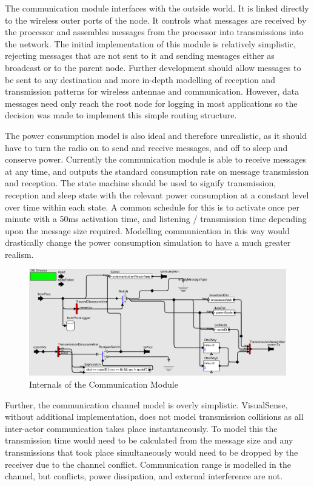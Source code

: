 \documentclass[authoryearcitations]{UoYCSproject}
\begin{document}
The communication module interfaces with the outside world. It is linked directly to the wireless outer ports of the node. It controls what messages are received by the processor and assembles messages from the processor into transmissions into the network. The initial implementation of this module is relatively simplistic, rejecting messages that are not sent to it and sending messages either as broadcast or to the parent node. Further development should allow messages to be sent to any destination and more in-depth modelling of reception and transmission patterns for wireless antennae and communication. However, data messages need only reach the root node for logging in most applications so the decision was made to implement this simple routing structure.

The power consumption model is also ideal and therefore unrealistic, as it should have to turn the radio on to send and receive messages, and off to sleep and conserve power. Currently the communication module is able to receive messages at any time, and outputs the standard consumption rate on message transmission and reception. The state machine should be used to signify transmission, reception and sleep state with the relevant power consumption at a constant level over time within each state. A common schedule for this is to activate once per minute with a 50ms activation time, and listening / transmission time depending upon the message size required. Modelling communication in this way would drastically change the power consumption simulation to have a much greater realism.

\begin{figure}
 \centering
    \includegraphics[width=\textwidth]{figures/communicationInternals.png}
    \caption{Internals of the Communication Module}
    \label{fig:commInternals}
\end{figure}

Further, the communication channel model is overly simplistic. VisualSense, without additional implementation, does not model transmission collisions as all inter-actor communication takes place instantaneously. To model this the transmission time would need to be calculated from the message size and any transmissions that took place simultaneously would need to be dropped by the receiver due to the channel conflict. Communication range is modelled in the channel, but conflicts, power dissipation, and external interference are not.
\end{document}
